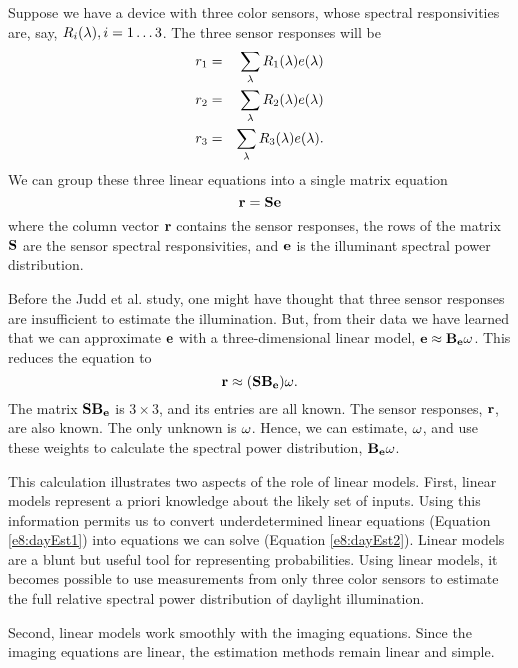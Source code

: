 Suppose we have a device with three color sensors, whose spectral
responsivities are, say, $\mbox{$R_{i}$}(\lambda), i = 1 \ldots 3$.  The
three sensor responses will be
\begin{eqnarray}
\label{e8:recIll}
\mbox{$r_{1}$} & = & \sum_\lambda \mbox{$R_{1}$}(\lambda) \mbox{$e(\lambda)$} \nonumber \\
\mbox{$r_{2}$} & = & \sum_\lambda \mbox{$R_{2}$}(\lambda) \mbox{$e(\lambda)$} \nonumber \\
\mbox{$r_{3}$} & = & \sum_\lambda \mbox{$R_{3}$}(\lambda) \mbox{$e(\lambda)$}  . 
\end{eqnarray}
We can group these three linear equations into a single matrix
equation
\begin{equation}
\label{e8:dayEst1}
\mbox{$\bf r$} = \mbox{$\bf S$} \mbox{$\bf e$}
\end{equation}
where the column vector
$\mbox{$\bf r$}$ contains the sensor responses, 
the rows of the matrix $\mbox{$\bf S$}$ are the sensor spectral responsivities,
and $\mbox{$\bf e$}$ is the illuminant spectral power distribution.

Before the Judd et al. study, one might have thought that three sensor
responses are insufficient to estimate the illumination.  But, from
their data we have learned that we can approximate $\mbox{$\bf e$}$ with a
three-dimensional linear model, $\mbox{$\bf e$} \approx \mbox{$\bf B_e$} \mbox{${\bf \omega}$}$.
This reduces the equation to
\begin{equation}
\label{e8:dayEst2}
\mbox{$\bf r$} \approx (\mbox{$\bf S$} \mbox{$\bf B_e$}) \mbox{${\bf \omega}$} .
\end{equation}
The matrix $\mbox{$\bf S$} \mbox{$\bf B_e$}$ is $3 \times 3$, and its entries are
all known.  The sensor responses, $\mbox{$\bf r$}$, are also known.  The
only unknown is $\mbox{${\bf \omega}$}$.  Hence, we can estimate, $\mbox{${\bf \omega}$}$, and
use these weights to calculate the spectral power distribution,
$\mbox{$\bf B_e$} \mbox{${\bf \omega}$}$.

This calculation illustrates two aspects of the role of linear models.
First, linear models represent a priori knowledge about the likely set
of inputs.  Using this information permits us to convert
underdetermined linear equations (Equation \ref{e8:dayEst1}) into
equations we can solve (Equation \ref{e8:dayEst2}).  Linear models are
a blunt but useful tool for representing probabilities.  Using linear
models, it becomes possible to use measurements from only three
color sensors to estimate the full relative spectral power
distribution of daylight illumination.

Second, linear models work smoothly with the imaging equations.  Since
the imaging equations are linear, the estimation methods remain linear
and simple.

